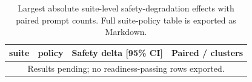 \begin{table}[t]
\centering
\begingroup
\small
\setlength{\tabcolsep}{3pt}
\renewcommand{\arraystretch}{0.94}
\begin{tabularx}{\linewidth}{@{}llXX@{}}
\toprule
suite & policy & Safety delta [95\% CI] & Paired / clusters \\
\midrule
\multicolumn{4}{c}{Results pending; no readiness-passing rows exported.} \\
\bottomrule
\end{tabularx}
\endgroup
\caption{Largest absolute suite-level safety-degradation effects with paired prompt counts. Full suite-policy table is exported as Markdown.}
\label{tab:suite-effects}
\end{table}
